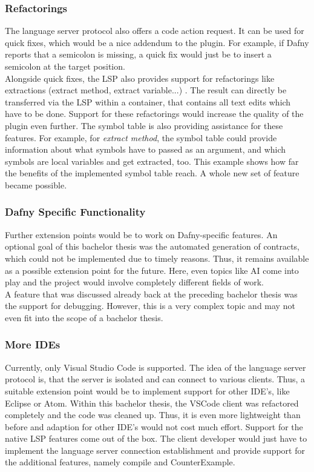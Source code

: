 \subsubsection{Refactorings}
The language server protocol also offers a code action request.
It can be used for quick fixes, which would be a nice addendum to the plugin.
For example, if Dafny reports that a semicolon is missing, a quick fix would just be to insert a semicolon at the target position.\\

Alongside quick fixes, the LSP also provides support for refactorings like extractions (extract method, extract variable...) \cite{lspspec}.
The result can directly be transferred via the LSP within a  container, that contains all text edits which have to be done.
Support for these refactorings would increase the quality of the plugin even further.
The symbol table is also providing assistance for these features.
For example, for \textit{extract method}, the symbol table could provide information about what symbols have to passed as an argument, and which symbols are local variables and get extracted, too.
This example shows how far the benefits of the implemented symbol table reach.
A whole new set of feature became possible.

\subsubsection{Dafny Specific Functionality}
Further extension points would be to work on Dafny-specific features.
An optional goal of this bachelor thesis was the automated generation of contracts, which could not be implemented due to timely reasons.
Thus, it remains available as a possible extension point for the future.
Here, even topics like AI come into play and the project would involve completely different fields of work.\\

A feature that was discussed already back at the preceding bachelor thesis \cite{ba} was the support for debugging.
However, this is a very complex topic and may not even fit into the scope of a bachelor thesis.

\subsubsection{More IDEs}
Currently, only Visual Studio Code is supported.
The idea of the language server protocol is, that the server is isolated and can connect to various clients.
Thus, a suitable extension point would be to implement support for other IDE's, like Eclipse or Atom.
Within this bachelor thesis, the VSCode client was refactored completely and the code was cleaned up.
Thus, it is even more lightweight than before and adaption for other IDE's would not cost much effort.
Support for the native LSP features come out of the box.
The client developer would just have to implement the language server connection establishment and provide support for the additional features, namely compile and CounterExample.

